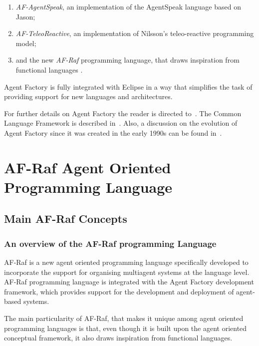\documentclass[a4paper,12pt,oneside,fleqn]{book} %
\newcommand{\todo}[1]{[\textcolor{red}{TODO}: #1]}
\begin{document}
{\begin{enumerate}
\item \textit{AF-AgentSpeak}, an implementation of the AgentSpeak language based on Jason;

\item \textit{AF-TeleoReactive}, an implementation of Nilsson's teleo-reactive
programming model;

\item and the new \textit{AF-Raf} programming language, that draws
inspiration from functional languages .
\end{enumerate}

Agent Factory is fully integrated with Eclipse in a way that simplifies
the task of providing support for new languages and architectures.

For further details on Agent Factory the reader is directed
to~\cite{collier2009modeling}. The Common Language Framework is described
in~\cite{russell2011af}. Also, a discussion on the evolution of Agent
Factory since it was created in the early 1990s can be found
in~\cite{muldoon2009towards}.


\part{AF-Raf Agent Oriented Programming Language}\label{part:AF-Raf} %
\chapter{Main AF-Raf Concepts}\label{ch:concepts} %


\section{An overview of the AF-Raf programming Language} %

AF-Raf is a new agent oriented programming language specifically developed
to incorporate the support for organising multiagent systems at the
language level. AF-Raf programming language is integrated with the
Agent Factory development framework, which provides support for the
development and deployment of agent-based systems.

The main particularity of AF-Raf, that makes it unique among agent oriented
programming languages is that, even though it is built upon the agent
oriented conceptual framework, it also draws inspiration from functional
languages.

}
\end{document}
